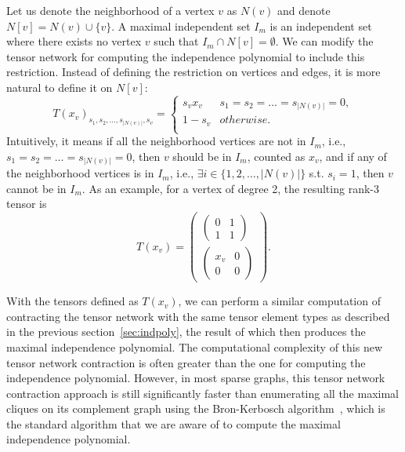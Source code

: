 \documentclass[onefignum, onetabnum]{siamart190516}
\newcommand{\<}{\langle}
\renewcommand{\>}{\rangle}
\newcounter{example}
\begin{document}
Let us denote the neighborhood of a vertex $v$ as $N(v)$ and denote $N[v] = N(v)\cup \{v\}$. A maximal independent set $I_m$ is an independent set where there exists no vertex $v$ such that $I_m \cap N[v]  = \emptyset$. We can modify the tensor network for computing the independence polynomial to include this restriction. Instead of defining the restriction on vertices and edges, it is more natural to define it on $N[v]$:
\begin{equation}\label{eq:maximal}
    T(x_v)_{s_1,s_2,\ldots,s_{|N(v)|},s_v} = \begin{cases}
        s_vx_v & s_1=s_2=\ldots=s_{|N(v)|}=0,\\
        1-s_v& otherwise.\\
    \end{cases}
\end{equation}
Intuitively, it means if all the neighborhood vertices are not in $I_{m}$, i.e., $ s_1=s_2=\ldots=s_{|N(v)|}=0$, then $v$ should be in $I_{m}$, counted as $x_{v}$, and if any of the neighborhood vertices is in $I_{m}$, i.e., $\exists i \in \{1,2,\ldots, |N(v)|\}$ s.t. $s_{i} = 1$, then $v$ cannot be in $I_{m}$. As an example, for a vertex of degree 2, the resulting rank-3 tensor is
\begin{equation}
    T(x_v)=\left(\begin{matrix}
    \left(\begin{matrix}
        0 &1 \\
        1 &1
    \end{matrix}\right)\\
    \left(\begin{matrix}
        x_v &0 \\
        0 &0
    \end{matrix}\right)
    \end{matrix}\right).
\end{equation}
 
With the tensors defined as $T(x_v)$, we can perform a similar computation of contracting the tensor network with the same tensor element types as described in the previous section~\ref{sec:indpoly}, the result of which then produces the maximal independence polynomial. The computational complexity of this new tensor network contraction is often greater than the one for computing the independence polynomial. However, in most sparse graphs, this tensor network contraction approach is still significantly faster than enumerating all the maximal cliques on its complement graph using the Bron-Kerbosch algorithm~\cite{Bron1973Algorithm}, which is the standard algorithm that we are aware of to compute the maximal independence polynomial.
\end{document}
